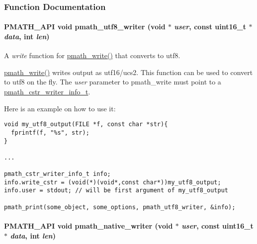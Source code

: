 \subsubsection{Function Documentation}
\hypertarget{group__strings_g5e7a9b1a5eb8861e94dc1bea92c77424}{
\paragraph[{pmath\_\-utf8\_\-writer}]{\setlength{\rightskip}{0pt plus 5cm}PMATH\_\-API void pmath\_\-utf8\_\-writer (void $\ast$ {\em user}, \/  const uint16\_\-t $\ast$ {\em data}, \/  int {\em len})}\hfill}
\label{group__strings_g5e7a9b1a5eb8861e94dc1bea92c77424}


A {\em write\/} function for \hyperlink{group__objects_g9f909b9eb04317260ee8630d10e5a7c6}{pmath\_\-write()} that converts to utf8. 

\hyperlink{group__objects_g9f909b9eb04317260ee8630d10e5a7c6}{pmath\_\-write()} writes output as utf16/ucs2. This function can be used to convert to utf8 on the fly. The {\em user\/} parameter to pmath\_\-write must point to a \hyperlink{structpmath__cstr__writer__info__t}{pmath\_\-cstr\_\-writer\_\-info\_\-t}.

Here is an example on how to use it: 

\begin{Code}\begin{verbatim}void my_utf8_output(FILE *f, const char *str){
  fprintf(f, "%s", str);
}

...

pmath_cstr_writer_info_t info;
info.write_cstr = (void(*)(void*,const char*))my_utf8_output;
info.user = stdout; // will be first argument of my_utf8_output

pmath_print(some_object, some_options, pmath_utf8_writer, &info);
\end{verbatim}
\end{Code}

 \hypertarget{group__strings_ga3ecac6a71274a3e43cedadb10085f2b}{
\paragraph[{pmath\_\-native\_\-writer}]{\setlength{\rightskip}{0pt plus 5cm}PMATH\_\-API void pmath\_\-native\_\-writer (void $\ast$ {\em user}, \/  const uint16\_\-t $\ast$ {\em data}, \/  int {\em len})}\hfill}
\label{group__strings_ga3ecac6a71274a3e43cedadb10085f2b}



